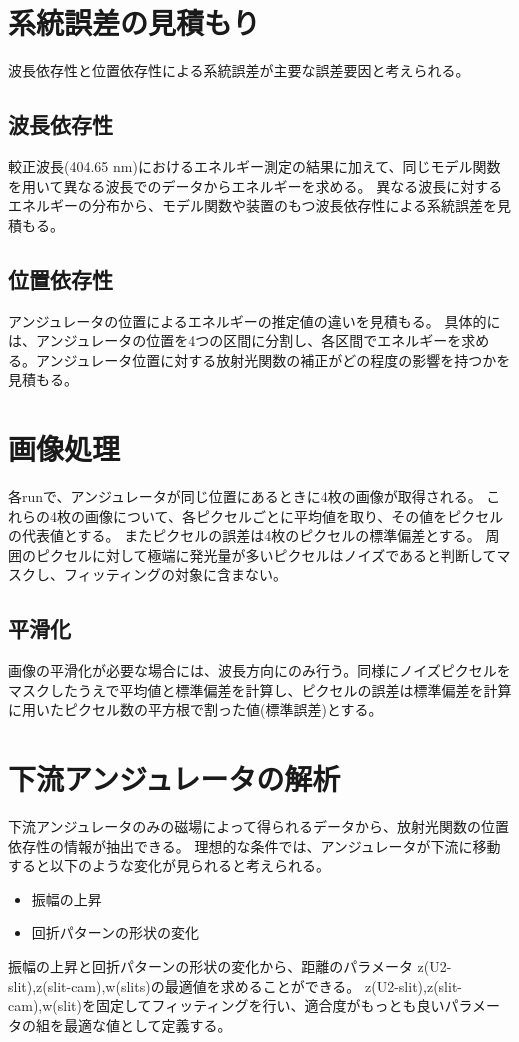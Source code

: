 \documentclass[a4paper,11pt,uplatex]{jsbook}
\begin{document}
\section{系統誤差の見積もり}
波長依存性と位置依存性による系統誤差が主要な誤差要因と考えられる。
\subsection{波長依存性}
較正波長(404.65 nm)におけるエネルギー測定の結果に加えて、同じモデル関数を用いて異なる波長でのデータからエネルギーを求める。
異なる波長に対するエネルギーの分布から、モデル関数や装置のもつ波長依存性による系統誤差を見積もる。
\subsection{位置依存性}
アンジュレータの位置によるエネルギーの推定値の違いを見積もる。
具体的には、アンジュレータの位置を4つの区間に分割し、各区間でエネルギーを求める。アンジュレータ位置に対する放射光関数の補正がどの程度の影響を持つかを見積もる。

\section{画像処理}
各runで、アンジュレータが同じ位置にあるときに4枚の画像が取得される。
これらの4枚の画像について、各ピクセルごとに平均値を取り、その値をピクセルの代表値とする。
またピクセルの誤差は4枚のピクセルの標準偏差とする。
周囲のピクセルに対して極端に発光量が多いピクセルはノイズであると判断してマスクし、フィッティングの対象に含まない。

\subsection{平滑化}
画像の平滑化が必要な場合には、波長方向にのみ行う。同様にノイズピクセルをマスクしたうえで平均値と標準偏差を計算し、ピクセルの誤差は標準偏差を計算に用いたピクセル数の平方根で割った値(標準誤差)とする。
\section{下流アンジュレータの解析}
下流アンジュレータのみの磁場によって得られるデータから、放射光関数の位置依存性の情報が抽出できる。
理想的な条件では、アンジュレータが下流に移動すると以下のような変化が見られると考えられる。
\begin{itemize}
  \item 振幅の上昇
  \item 回折パターンの形状の変化
\end{itemize}
振幅の上昇と回折パターンの形状の変化から、距離のパラメータ z(U2-slit),z(slit-cam),w(slits)の最適値を求めることができる。
z(U2-slit),z(slit-cam),w(slit)を固定してフィッティングを行い、適合度がもっとも良いパラメータの組を最適な値として定義する。
\end{document}
